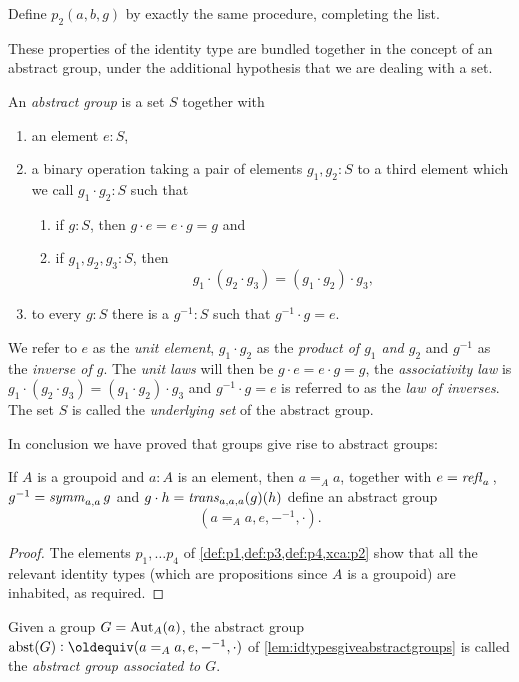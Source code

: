 \begin{xca}\label{xca:p2}
    Define $p_2(a,b,g)$ %
by exactly the same procedure, completing the list.
\end{xca}


These properties of the identity type are bundled together in the concept of an abstract group, under the additional hypothesis that we are dealing with a set.

  \begin{definition}\label{def:abstractgroup}
    An \emph{abstract group} is a set $S$ together with
\begin{enumerate}
\item an element $e:S$,
\item a binary operation taking a pair of elements $g_1,g_2:S$ to a third element which we call $g_1\cdot g_2:S$ such that
  \begin{enumerate}
  \item %
if $g:S$, then $g\cdot e=e\cdot g=g$ and
  \item %
if $g_1,g_2,g_3:S$, then
$$g_1\cdot(g_2\cdot g_3)=(g_1\cdot g_2)\cdot g_3,$$
  \end{enumerate}
\item %
to every $g:S$ there is a $g^{-1}:S$ such that $%
g^{-1}\cdot g=e$.
\end{enumerate}
We refer to $e$ as the \emph{unit element}, $g_1\cdot g_2$ as the \emph{product of $g_1$ and $g_2$} and $g^{-1}$ as the \emph{inverse of $g$}.  The \emph{unit laws} will then be $g\cdot e=e\cdot g=g$, the \emph{associativity law} is $g_1\cdot(g_2\cdot g_3)=(g_1\cdot g_2)\cdot g_3$ and $%
g^{-1}\cdot g=e$ is referred to as the \emph{law of inverses}.  The set $S$ is called the \emph{underlying set} of the abstract group.
  \end{definition}

In conclusion we have proved that groups give rise to abstract groups:
\newcommand{\abstr}{\mathrm{abst}}
  \begin{lemma}\label{lem:idtypesgiveabstractgroups}
    If $A$ is a groupoid %
and $a:A$ is an element, then $a=_Aa$, together with $e=\mathop{{\it refl}_{a}}{}$, $g^{-1}=\mathop{\mathit{symm}}_{a,a}g$ and $g\cdot h=\mathop{\mathit{trans}}_{a,a,a}(g)(h)$ define an abstract group
$$(a=_Aa,e,{-}^{-1},\cdot).$$
  \end{lemma}
  \begin{proof}
    The elements $p_1,\dots p_4$ of \cref{def:p1,def:p3,def:p4,xca:p2} show that all the relevant identity types (which are propositions since $A$ is a groupoid) are inhabited, as required.
  \end{proof}
  \begin{definition}\label{def:abstrG}
    Given a group $G=\mathrm{Aut}_A(a)$, the abstract group $\abstr(G)\defequi (a=_Aa,e,{-}^{-1},\cdot)$ of \cref{lem:idtypesgiveabstractgroups} is called the \emph{abstract group associated to $G$}.
  \end{definition}

